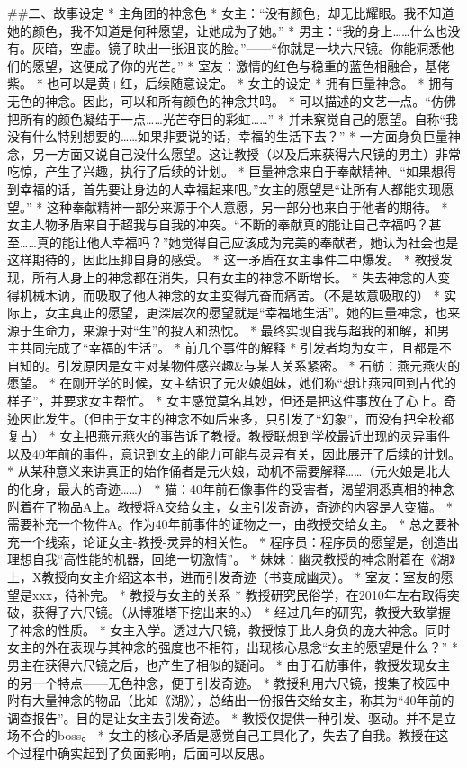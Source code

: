 	
##二、故事设定
* 主角团的神念色
	* 女主：“没有颜色，却无比耀眼。我不知道她的颜色，我不知道是何种愿望，让她成为了她。”
	* 男主：“我的身上……什么也没有。灰暗，空虚。镜子映出一张沮丧的脸。”——“你就是一块六尺镜。你能洞悉他们的愿望，这便成了你的光芒。”
	* 室友：激情的红色与稳重的蓝色相融合，基佬紫。
		* 也可以是黄+红，后续随意设定。
* 女主的设定
	* 拥有巨量神念。
	* 拥有无色的神念。因此，可以和所有颜色的神念共鸣。
		* 可以描述的文艺一点。“仿佛把所有的颜色凝结于一点……光芒夺目的彩虹……”
	* 并未察觉自己的愿望。自称“我没有什么特别想要的……如果非要说的话，幸福的生活下去？”
		* 一方面身负巨量神念，另一方面又说自己没什么愿望。这让教授（以及后来获得六尺镜的男主）非常吃惊，产生了兴趣，执行了后续的计划。
	* 巨量神念来自于奉献精神。“如果想得到幸福的话，首先要让身边的人幸福起来吧。”女主的愿望是“让所有人都能实现愿望。”
		* 这种奉献精神一部分来源于个人意愿，另一部分也来自于他者的期待。
	* 女主人物矛盾来自于超我与自我的冲突。“不断的奉献真的能让自己幸福吗？甚至……真的能让他人幸福吗？”她觉得自己应该成为完美的奉献者，她认为社会也是这样期待的，因此压抑自身的感受。
	* 这一矛盾在女主事件二中爆发。
		* 教授发现，所有人身上的神念都在消失，只有女主的神念不断增长。
		* 失去神念的人变得机械木讷，而吸取了他人神念的女主变得亢奋而痛苦。（不是故意吸取的）
	* 实际上，女主真正的愿望，更深层次的愿望就是“幸福地生活”。她的巨量神念，也来源于生命力，来源于对“生”的投入和热忱。
	* 最终实现自我与超我的和解，和男主共同完成了“幸福的生活”。
* 前几个事件的解释
	* 引发者均为女主，且都是不自知的。引发原因是女主对某物件感兴趣&与某人关系紧密。
	* 石舫：燕元燕火的愿望。
		* 在刚开学的时候，女主结识了元火娘姐妹，她们称“想让燕园回到古代的样子”，并要求女主帮忙。
		* 女主感觉莫名其妙，但还是把这件事放在了心上。奇迹因此发生。（但由于女主的神念不如后来多，只引发了“幻象”，而没有把全校都复古）
		* 女主把燕元燕火的事告诉了教授。教授联想到学校最近出现的灵异事件以及40年前的事件，意识到女主的能力可能与灵异有关，因此展开了后续的计划。
		* 从某种意义来讲真正的始作俑者是元火娘，动机不需要解释……（元火娘是北大的化身，最大的奇迹……）
	* 猫：40年前石像事件的受害者，渴望洞悉真相的神念附着在了物品A上。教授将A交给女主，女主引发奇迹，奇迹的内容是人变猫。
		* 需要补充一个物件A。作为40年前事件的证物之一，由教授交给女主。
		* 总之要补充一个线索，论证女主-教授-灵异的相关性。
	* 程序员：程序员的愿望是，创造出理想自我“高性能的机器，回绝一切激情”。
	* 妹妹：幽灵教授的神念附着在《湖》上，X教授向女主介绍这本书，进而引发奇迹（书变成幽灵）。
	* 室友：室友的愿望是xxx，待补完。
* 教授与女主的关系
	* 教授研究民俗学，在2010年左右取得突破，获得了六尺镜。（从博雅塔下挖出来的x）
	* 经过几年的研究，教授大致掌握了神念的性质。
	* 女主入学。透过六尺镜，教授惊于此人身负的庞大神念。同时女主的外在表现与其神念的强度也不相符，出现核心悬念“女主的愿望是什么？”
		* 男主在获得六尺镜之后，也产生了相似的疑问。
	* 由于石舫事件，教授发现女主的另一个特点——无色神念，便于引发奇迹。
	* 教授利用六尺镜，搜集了校园中附有大量神念的物品（比如《湖》），总结出一份报告交给女主，称其为“40年前的调查报告”。目的是让女主去引发奇迹。
	* 教授仅提供一种引发、驱动。并不是立场不合的boss。
	* 女主的核心矛盾是感觉自己工具化了，失去了自我。教授在这个过程中确实起到了负面影响，后面可以反思。

